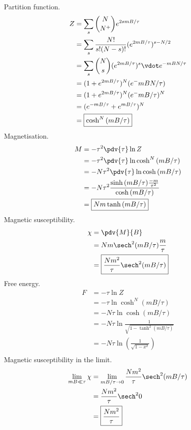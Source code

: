 \documentclass[newpage]{homework}
\begin{document}
\question
Partition function.
\begin{align*}
    Z	&=	\sum_s \binom{N}{N^{+}} e^{2smB/\tau}	\\
        &=	\sum_s \frac{N!}{s!(N-s)!} (e^{2mB/\tau})^{s-N/2}   \\
        &=	\sum_s \binom{N}{s} (e^{2mB/\tau})^s \vdot e^{-mBN/\tau}	\\
        &=	(1 + e^{2mB/\tau})^N (e^-mBN/\tau)	\\
        &=	(1 + e^{2mB/\tau})^N (e^-mB/\tau)^N	\\
        &=	(e^{-mB/\tau} + e^{mB/\tau})^N	\\
        &=	\boxed{\cosh^N{(mB/\tau)}}	\\
\end{align*}
Magnetisation.
\begin{align*}
    M	&=	- \tau^2 \pdv{\tau} \ln Z	\\
        &=	- \tau^2 \pdv{\tau}\ln \cosh^N{(mB/\tau)}	\\
        &=	- N \tau^2 \pdv{\tau} \ln \cosh{(mB/\tau)}	\\
        &=	- N \tau^2 \frac{\sinh{(mB/\tau)}\frac{-m}{\tau^2}}{\cosh{(mB/\tau)}}	\\
        &=	\boxed{Nm \tanh{(mB/\tau)}}	\\
\end{align*}
Magnetic susceptibility.
\begin{align*}
    \chi	&=	\pdv{M}{B}	\\
        &=	Nm \sech^2{(mB/\tau)} \frac{m}{\tau}	\\
        &=	\boxed{\frac{Nm^2}{\tau} \sech^2{(mB/\tau)}}	\\
\end{align*}
Free energy.
\begin{align*}
    F	&=	-\tau \ln{Z}	\\
        &=	-\tau \ln \cosh^N (mB/\tau)	\\
        &=	-N\tau \ln \cosh (mB/\tau)	\\
        &=	-N\tau \ln \frac{1}{\sqrt{1-\tanh^2 (mB/\tau)}}	\\
        &=  \boxed{-N\tau \ln \left(\frac{1}{\sqrt{1-x^2}}\right)}	\\
\end{align*}
Magnetic susceptibility in the limit.
\begin{align*}
    \lim_{mB \ll \tau} \chi	&=	\lim_{mB/\tau \rightarrow 0} \frac{Nm^2}{\tau} \sech^2{(mB/\tau)}	\\
        &=	\frac{Nm^2}{\tau} \sech^2{0}	\\
        &=	\boxed{\frac{Nm^2}{\tau}}	\\
\end{align*}
\end{document}
